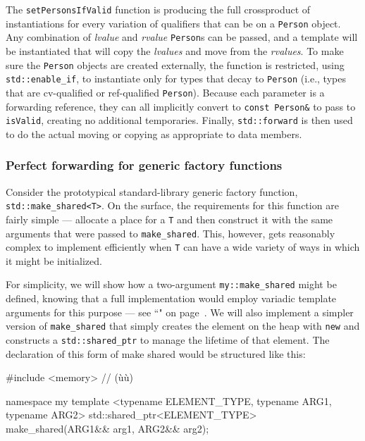 \noindent The \texttt{setPersonsIfValid} function is producing the full crossproduct of instantiations for every variation of qualifiers that can be
on a \texttt{Person} object. Any combination of \emph{lvalue} and
\emph{rvalue} \texttt{Person}s can be passed, and a template will be
instantiated that will copy the \emph{lvalues} and move from the
\emph{rvalues}. To make sure the \texttt{Person} objects are
created externally, the function is restricted, using
\texttt{std::enable\_if}, to instantiate only for types that decay to
\texttt{Person} (i.e., types that are cv-qualified or ref-qualified
\texttt{Person}). Because each parameter is a forwarding reference, they
can all implicitly convert to \texttt{const}~\texttt{Person\&} to pass
to \texttt{isValid}, creating no additional temporaries. Finally,
\texttt{std::forward} is then used to do the actual moving or copying as
appropriate to data members.

\subsubsection[Perfect forwarding for generic factory functions]{Perfect forwarding for generic factory functions}\label{perfect-forwarding-for-generic-factory-functions}

Consider the prototypical standard-library generic factory function,
\texttt{std::make\_shared<T>}. On the surface, the requirements for this
function are fairly simple --- allocate a place for a \texttt{T} and
then construct it with the same arguments that were passed to
\texttt{make\_shared}. This, however, gets reasonably complex to
implement efficiently when \texttt{T} can have a wide variety of ways in
which it might be initialized.

For simplicity, we will show how a two-argument \texttt{my::make\_shared}
might be defined, knowing that a full implementation would employ
variadic template arguments for this purpose --- see ``" on page~\pageref{variable-templates}. We will also implement a simpler
version of \texttt{make\_shared} that simply creates the element on the
heap with \texttt{new} and constructs a \texttt{std::shared\_ptr} to
manage the lifetime of that element. The declaration of this form of
make shared would be structured like this:

\begin{emcppshiddenlisting}[emcppsbatch=e9]
#include <memory>  // (ù{}ù)
\end{emcppshiddenlisting}
\begin{emcppslisting}[emcppsbatch=e9]
namespace my {
template <typename ELEMENT_TYPE, typename ARG1, typename ARG2>
std::shared_ptr<ELEMENT_TYPE> make_shared(ARG1&& arg1, ARG2&& arg2);
}
\end{emcppslisting}

